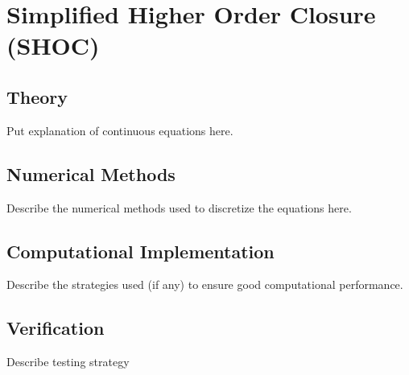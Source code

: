 \section{Simplified Higher Order Closure (SHOC)}

\subsection{Theory}

Put explanation of continuous equations here.

\subsection{Numerical Methods}

Describe the numerical methods used to discretize the equations here.

\subsection{Computational Implementation}

Describe the strategies used (if any) to ensure good computational performance.

\subsection{Verification}

Describe testing strategy

